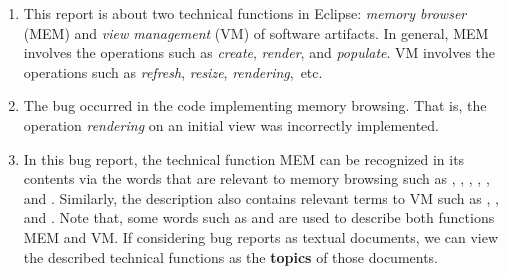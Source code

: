 
\begin{enumerate}

\item This report is about two technical functions in Eclipse:
  \emph{memory browser} (MEM) and \emph{view management} (VM) of
  software artifacts. In general, MEM involves the operations such as
  \emph{create}, \emph{render}, and \emph{populate}. VM involves the
  operations such as {\em refresh}, {\em resize}, {\em rendering},~etc.

\item The bug occurred in the code implementing memory browsing. That
  is, the operation {\em rendering}  on an initial view
   was incorrectly implemented.

\item In this bug report, the technical function MEM can be recognized
  in its contents via the words that are relevant to memory browsing
  such as , , , ,
  , and .
  Similarly, the description also contains relevant terms to VM such
  as , , and . Note that,
  some words such as  and  are used to
  describe both functions MEM and VM. If considering bug reports as
  textual documents, we can view the described technical functions as
  the \textbf{topics} of those documents.

\end{enumerate}






